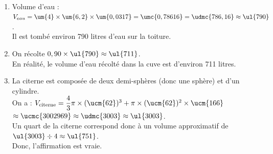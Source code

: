 \begin{corrige}
\ \\ [-5mm]
   \begin{enumerate}
      \item Volume d'eau : $V_{eau} =\um{4}\times\um{6,2}\times\um{0,0317} =\umc{0,78616} =\udmc{786,16} \approx \ul{790}$. \\
         {\blue Il est tombé environ 790 litres d'eau sur la toiture}.
      \item On récolte $0,90\times\ul{790} \approx\ul{711}$. \\
         {\blue En réalité, le volume d'eau récolté dans la cuve est d'environ 711 litres.}
      \item La citerne est composée de deux demi-sphères (donc une sphère) et d'un cylindre. \\
         On a : $V_{\text{citerne}} = \dfrac43\pi\times(\ucm{62})^3+\pi\times(\ucm{62})^2\times\ucm{166}$ \\ [1mm]
         \hspace*{2cm} $\approx \ucmc{3002969}  \approx \udmc{3003} \approx \ul{3003}$. \\ [1mm] 
         Un quart de la citerne correspond donc à un volume approximatif de $\ul{3003}\div4 \approx\ul{751}$. \\
         Donc, {\blue l'affirmation est vraie}.
   \end{enumerate}
\end{corrige}

\bigskip


